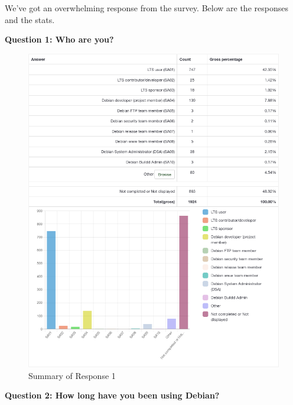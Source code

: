 \documentclass{article}
\begin{document}
\vspace{3mm}
We've got an overwhelming response from the survey. Below are the responses and the stats.

\newpage

\Large{\textbf{Question 1: Who are you?}}

\vspace{3mm}
\begin{figure}[h!]
\centering
\includegraphics[width=16.9cm]{assets/1-summary.png}
\caption{Summary of Response 1}
\end{figure}

\newpage

\Large{\textbf{Question 2: How long have you been using Debian?}}
\end{document}
